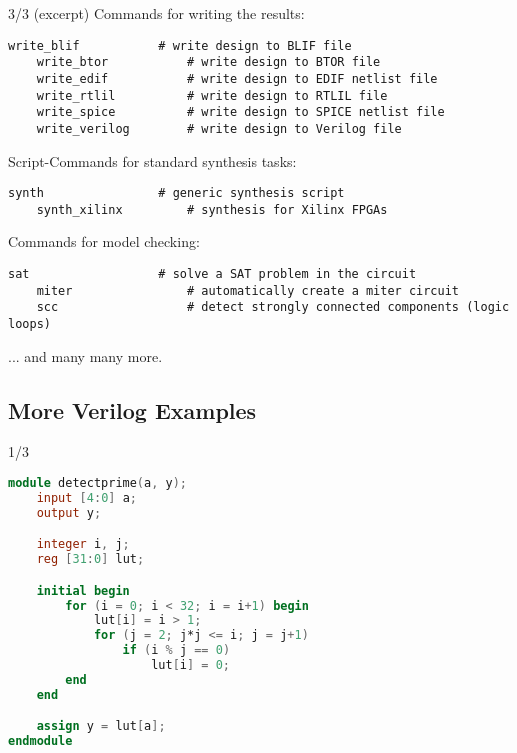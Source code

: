 \begin{frame}[fragile]{\subsecname{} 3/3 \hspace{0pt plus 1 filll} (excerpt)}
Commands for writing the results:
\begin{lstlisting}[xleftmargin=1cm, basicstyle=\ttfamily\fontsize{8pt}{10pt}\selectfont, language=ys]
    write_blif           # write design to BLIF file
    write_btor           # write design to BTOR file
    write_edif           # write design to EDIF netlist file
    write_rtlil          # write design to RTLIL file
    write_spice          # write design to SPICE netlist file
    write_verilog        # write design to Verilog file
\end{lstlisting}

\bigskip
Script-Commands for standard synthesis tasks:
\begin{lstlisting}[xleftmargin=1cm, basicstyle=\ttfamily\fontsize{8pt}{10pt}\selectfont, language=ys]
    synth                # generic synthesis script
    synth_xilinx         # synthesis for Xilinx FPGAs
\end{lstlisting}

\bigskip
Commands for model checking:
\begin{lstlisting}[xleftmargin=1cm, basicstyle=\ttfamily\fontsize{8pt}{10pt}\selectfont, language=ys]
    sat                  # solve a SAT problem in the circuit
    miter                # automatically create a miter circuit
    scc                  # detect strongly connected components (logic loops)
\end{lstlisting}

\bigskip
... and many many more.
\end{frame}


\subsection{More Verilog Examples}

\begin{frame}[fragile]{\subsecname{} 1/3}
\begin{lstlisting}[xleftmargin=1cm, basicstyle=\ttfamily\fontsize{8pt}{10pt}\selectfont, language=Verilog]
module detectprime(a, y);
    input [4:0] a;
    output y;

    integer i, j;
    reg [31:0] lut;

    initial begin
        for (i = 0; i < 32; i = i+1) begin
            lut[i] = i > 1;
            for (j = 2; j*j <= i; j = j+1)
                if (i % j == 0)
                    lut[i] = 0;
        end
    end

    assign y = lut[a];
endmodule
\end{lstlisting}
\end{frame}

